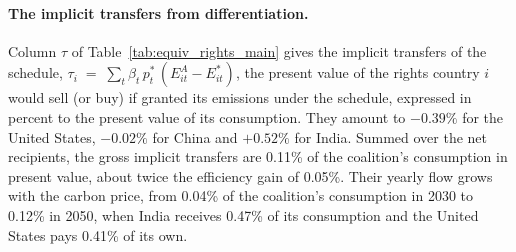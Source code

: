 \documentclass[12pt,english]{article}
\theoremstyle{remark}
\begin{document}
\paragraph{The implicit transfers from differentiation.} Column $\tau$ of Table~\ref{tab:equiv_rights_main} gives the implicit transfers of the \citet{banerjee_grand_2025} schedule, $\tau_i \;=\; \sum_t \beta_t\,p^*_t\,(E^A_{it}-E^*_{it})$, 
the present value of the rights country $i$ would sell (or buy) if granted its emissions under the schedule, expressed in percent to the present value of its consumption. They amount to $-0.39\%$ for the United States, $-0.02\%$ for China and $+0.52\%$ for India. Summed over the net recipients, the gross implicit transfers are 0.11\% of the coalition's consumption in present value, about twice the efficiency gain of 0.05\%.
Their yearly flow grows with the carbon price, from %
  0.04\% of the coalition's consumption in 2030  
to 0.12\% 
in 2050, %
when India receives 0.47\% of its consumption and the United States pays 0.41\% of its own.
\end{document}
